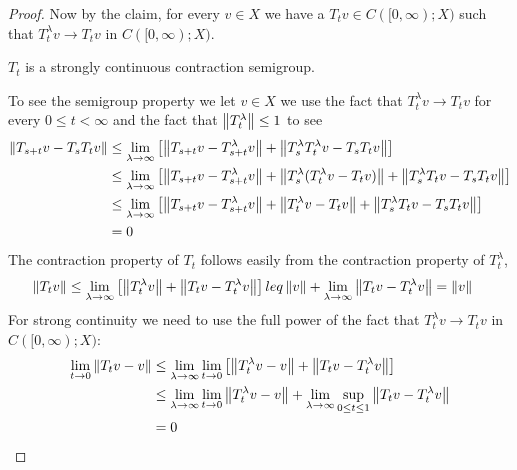 \begin{proof}
Now by the claim, for every $v \in X$ we have a $T_t v \in C([0,\infty); X)$ such that $T^\lambda_t v \to T_t v$ in $C([0,\infty); X)$.  
\begin{clm} $T_t$ is a strongly continuous contraction semigroup.
\end{clm}
To see the semigroup property we let $v \in X$ we use the fact that $T^\lambda_t v \to T_t v$ for every $0 \leq t < \infty$ and the fact that $\left \lVert T^\lambda_t \right \rVert \leq 1$ to see
\begin{align*}
\left \lVert T_{s+t} v - T_s T_t v \right \rVert &\leq \lim_{\lambda \to \infty} \left [\left \lVert T_{s+t} v - T^\lambda_{s+t} v \right \rVert + \left \lVert T^\lambda_s T^\lambda_t v - T_s T_t v \right \rVert  \right] \\
&\leq \lim_{\lambda \to \infty} \left[ \left \lVert T_{s+t} v - T^\lambda_{s+t} v  \right \rVert + \left \lVert T^\lambda_s (T^\lambda_t v - T_t v) \right \rVert + \left \lVert T^\lambda_s T_t v - T_s T_t v \right \rVert \right] \\
&\leq \lim_{\lambda \to \infty} \left[ \left \lVert T_{s+t} v - T^\lambda_{s+t} v  \right \rVert + \left \lVert T^\lambda_t v - T_t v \right \rVert + \left \lVert T^\lambda_s T_t v - T_s T_t v \right \rVert \right] \\
&=0
\end{align*}
The contraction property of $T_t$ follows easily from the contraction property of $T^\lambda_t$,
\begin{align*}
\left \lVert T_t v \right \rVert &\leq \lim_{\lambda \to \infty} \left[\left \lVert T^\lambda_t v \right \rVert + \left \lVert T_tv - T^\lambda_t v \right \rVert \right] leq \left \lVert v \right \rVert + \lim_{\lambda \to \infty} \left \lVert T_tv - T^\lambda_t v \right \rVert = \left \lVert v \right \rVert
\end{align*}
For strong continuity we need to use the full power of the fact that $T^\lambda_t v \to T_t v$ in $C([0,\infty); X)$:
\begin{align*}
\lim_{t \to 0} \left \lVert T_t v - v \right \rVert &\leq \lim_{\lambda \to \infty} \lim_{t \to 0} \left[ \left \lVert T^\lambda_t v - v \right \rVert + \left \lVert T_t v - T^\lambda_t v \right \rVert \right] \\
&\leq \lim_{\lambda \to \infty} \lim_{t \to 0} \left \lVert T^\lambda_t v - v \right \rVert + \lim_{\lambda \to \infty} \sup_{0 \leq t \leq 1} \left \lVert T_t v - T^\lambda_t v \right \rVert \\
&= 0
\end{align*}


\end{proof}
